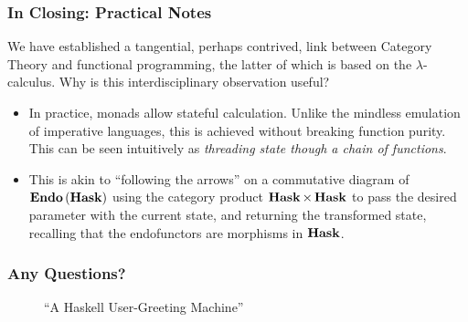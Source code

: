 \documentclass{beamer}
\numberwithin{figure}{section}
\DeclareMathOperator{\catendo}{\text{\textbf{Endo}}}
\DeclareMathOperator{\cathask}{\text{\textbf{Hask}}}
\begin{document}
\begin{frame}
        \frametitle{In Closing: Practical Notes}
        We have established a tangential, perhaps contrived, link between
        Category Theory and functional programming, the latter of which is 
        based on the $\lambda$-calculus. Why is this interdisciplinary
        observation useful?
        \pause
        \begin{itemize}[<+->]
                \item In practice, monads allow stateful calculation. Unlike
                the mindless emulation of imperative languages, this is achieved
                without breaking function purity. This can be seen intuitively
                as \textit{threading state though a chain of functions}.
                \item This is akin to ``following the arrows'' on a commutative
                diagram of $\catendo{(\cathask)}$ using the category product
                $\cathask \times \cathask$ to pass the desired parameter with
                the current state, and returning the transformed state,
                recalling that the endofunctors are morphisms in $\cathask$.
        \end{itemize}
\end{frame}

\begin{frame}[fragile]
        \frametitle{Any Questions?}

        \begin{figure}
                \caption*{``A Haskell User-Greeting Machine''}
        \end{figure}
\end{frame}
\end{document}
